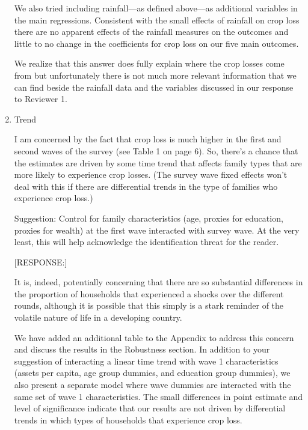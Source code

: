 \documentclass[letterpaper,12pt]{article}
\begin{document}
\begin{enumerate}
We also tried including rainfall---as defined above---as 
additional variables in the main regressions.
Consistent with the small effects of rainfall on crop loss
there are no apparent effects of the rainfall measures on the
outcomes and little to no change in the coefficients for crop
loss on our five main outcomes.

We realize that this answer does fully explain where the
crop losses come from but unfortunately there is not much
more relevant information that we can find beside the
rainfall data and the variables discussed in our response
to Reviewer 1.








\item Trend

I am concerned by the fact that crop loss is much higher in the first
and second waves of the survey (see Table 1 on page 6). So, there's a
chance that the estimates are driven by some time trend that affects
family types that are more likely to experience crop losses. (The survey
wave fixed effects won't deal with this if there are differential trends
in the type of families who experience crop loss.)

Suggestion: Control for family characteristics (age, proxies for
education, proxies for wealth) at the first wave interacted with survey
wave. At the very least, this will help acknowledge the identification
threat for the reader.


[RESPONSE:] 

It is, indeed, potentially concerning that there are so substantial
differences in the proportion of households that experienced a 
shocks over the different rounds, although it is possible that
this simply is a stark reminder of the volatile nature of life
in a developing country.

We have added an additional table to the Appendix to address this
concern and discuss the results in the Robustness section. 
In addition to your suggestion of interacting a linear
time trend with wave 1 characteristics (assets per capita,
age group dummies, and education group dummies), we also present
a separate model where wave dummies are interacted with the
same set of wave 1 characteristics.
The small differences in point estimate and level of significance 
indicate that our results are not driven by differential trends
in which types of households that experience crop loss.



\end{enumerate}
\end{document}
